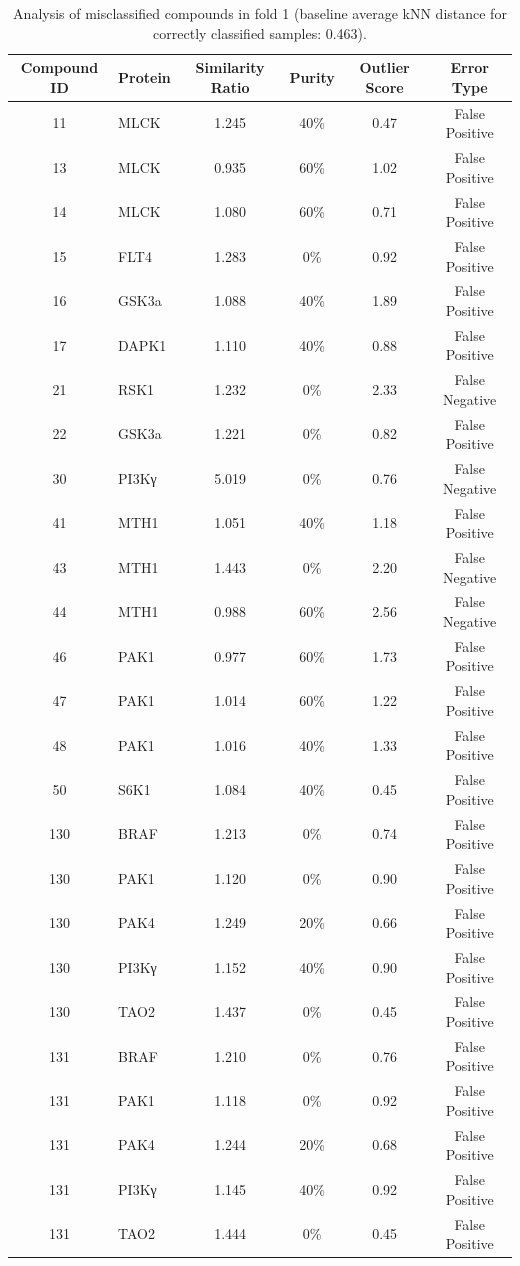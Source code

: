 \documentclass{article}
\newenvironment{smarttabular}[1]{%
    \begin{tabular}{#1}%
}{%
    \end{tabular}%
}
\begin{document}
\begin{table}[H]
    \centering
    \small
    \caption{Analysis of misclassified compounds in fold 1 (baseline average kNN distance for correctly classified samples: 0.463).}
    \label{tab:misclassified_compounds_1}
    \begin{smarttabular}{clcccc}
        \toprule
        \textbf{Compound ID} & \textbf{Protein} & \textbf{Similarity Ratio} & \textbf{Purity} & \textbf{Outlier Score} & \textbf{Error Type} \\
        \midrule
        11 & MLCK & 1.245 & 40\% & 0.47 & False Positive \\
        13 & MLCK & 0.935 & 60\% & 1.02 & False Positive \\
        14 & MLCK & 1.080 & 60\% & 0.71 & False Positive \\
        15 & FLT4 & 1.283 & 0\% & 0.92 & False Positive \\
        16 & GSK3a & 1.088 & 40\% & 1.89 & False Positive \\
        17 & DAPK1 & 1.110 & 40\% & 0.88 & False Positive \\
        21 & RSK1 & 1.232 & 0\% & 2.33 & False Negative \\
        22 & GSK3a & 1.221 & 0\% & 0.82 & False Positive \\
        30 & PI3Kγ & 5.019 & 0\% & 0.76 & False Negative \\
        41 & MTH1 & 1.051 & 40\% & 1.18 & False Positive \\
        43 & MTH1 & 1.443 & 0\% & 2.20 & False Negative \\
        44 & MTH1 & 0.988 & 60\% & 2.56 & False Negative \\
        46 & PAK1 & 0.977 & 60\% & 1.73 & False Positive \\
        47 & PAK1 & 1.014 & 60\% & 1.22 & False Positive \\
        48 & PAK1 & 1.016 & 40\% & 1.33 & False Positive \\
        50 & S6K1 & 1.084 & 40\% & 0.45 & False Positive \\
        130 & BRAF & 1.213 & 0\% & 0.74 & False Positive \\
        130 & PAK1 & 1.120 & 0\% & 0.90 & False Positive \\
        130 & PAK4 & 1.249 & 20\% & 0.66 & False Positive \\
        130 & PI3Kγ & 1.152 & 40\% & 0.90 & False Positive \\
        130 & TAO2 & 1.437 & 0\% & 0.45 & False Positive \\
        131 & BRAF & 1.210 & 0\% & 0.76 & False Positive \\
        131 & PAK1 & 1.118 & 0\% & 0.92 & False Positive \\
        131 & PAK4 & 1.244 & 20\% & 0.68 & False Positive \\
        131 & PI3Kγ & 1.145 & 40\% & 0.92 & False Positive \\
        131 & TAO2 & 1.444 & 0\% & 0.45 & False Positive \\
        \bottomrule
    \end{smarttabular}
\end{table}
\end{document}
